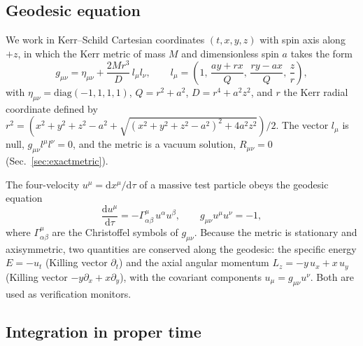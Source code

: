 \documentclass[11pt]{article}
\begin{document}
\subsection{Geodesic equation}

We work in Kerr--Schild Cartesian coordinates $(t,x,y,z)$ with spin axis
along $+z$, in which the Kerr metric of mass $M$ and dimensionless spin
$a$ takes the form \citep{kerrschild1965}
\begin{equation}
g_{\mu\nu} = \eta_{\mu\nu} + \frac{2Mr^3}{D}\,l_\mu l_\nu ,
\qquad
l_\mu = \left(1,\, \frac{a y + r x}{Q},\, \frac{r y - a x}{Q},\, \frac{z}{r}\right),
\label{eq:metric-form}
\end{equation}
with $\eta_{\mu\nu}=\mathrm{diag}(-1,1,1,1)$,
$Q = r^2 + a^2$, $D = r^4 + a^2z^2$, and $r$ the Kerr radial coordinate
defined by $r^2 = (x^2+y^2+z^2-a^2 + \sqrt{(x^2+y^2+z^2-a^2)^2 + 4a^2z^2})/2$.
The vector $l_\mu$ is null, $g_{\mu\nu}l^\mu l^\nu = 0$, and the metric is a
vacuum solution, $R_{\mu\nu} = 0$ (Sec.~\ref{sec:exactmetric}).

The four-velocity $u^\mu = \mathrm{d}x^\mu/\mathrm{d}\tau$ of a massive
test particle obeys the geodesic equation
\begin{equation}
\frac{\mathrm{d}u^\mu}{\mathrm{d}\tau} =
-\Gamma^\mu_{\alpha\beta}\,u^\alpha u^\beta ,
\qquad
g_{\mu\nu}u^\mu u^\nu = -1 ,
\label{eq:geo}
\end{equation}
where $\Gamma^\mu_{\alpha\beta}$ are the Christoffel symbols of $g_{\mu\nu}$.
Because the metric is stationary and axisymmetric, two quantities are
conserved along the geodesic: the specific energy
$E = -u_t$ (Killing vector $\partial_t$) and the axial angular momentum
$L_z = -y\,u_x + x\,u_y$ (Killing vector $-y\partial_x + x\partial_y$),
with the covariant components $u_\mu = g_{\mu\nu}u^\nu$.  Both
are used as verification monitors.

\subsection{Integration in proper time}
\end{document}
